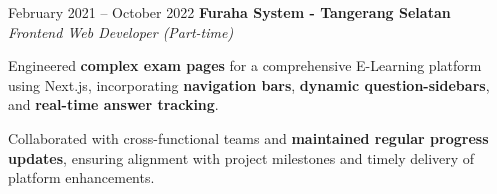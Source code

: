 \documentclass[../main.tex]{subfiles}
\begin{document}
\vspace{0.4 cm}

\begin{twocolentry}{
		February 2021 – October 2022}
	\textbf{Furaha System \color{Gray} - Tangerang Selatan}\\
	\textit{Frontend Web Developer (Part-time)}
\end{twocolentry}

\vspace{0.10 cm}
\begin{onecolentry}
	\begin{highlights}
  \item Engineered \textbf{complex exam pages} for a comprehensive E-Learning platform using Next.js, incorporating \textbf{navigation bars}, \textbf{dynamic question-sidebars}, and \textbf{real-time answer tracking}.
  \item Collaborated with cross-functional teams and \textbf{maintained regular progress updates}, ensuring alignment with project milestones and timely delivery of platform enhancements.
	\end{highlights}
\end{onecolentry}
\end{document}
